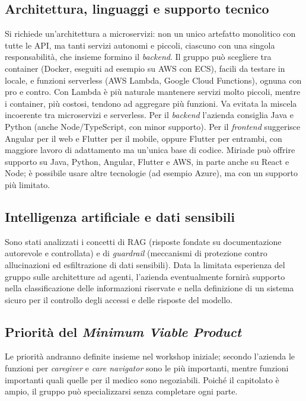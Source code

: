 \documentclass[11pt, a4paper]{article}
\begin{document}
\subsection{Architettura, linguaggi e supporto tecnico}
Si richiede un'architettura a microservizi: non un unico artefatto monolitico con tutte le API, ma tanti servizi autonomi e piccoli, ciascuno con una singola responsabilità, che insieme formino il \emph{backend}. Il gruppo può scegliere tra container (Docker, eseguiti ad esempio su AWS con ECS), facili da testare in locale, e funzioni serverless (AWS Lambda, Google Cloud Functions), ognuna con pro e contro. Con Lambda è più naturale mantenere servizi molto piccoli, mentre i container, più costosi, tendono ad aggregare più funzioni. Va evitata la miscela incoerente tra microservizi e serverless. Per il \emph{backend} l'azienda consiglia Java e Python (anche Node/TypeScript, con minor supporto). Per il \emph{frontend} suggerisce Angular per il web e Flutter per il mobile, oppure Flutter per entrambi, con maggiore lavoro di adattamento ma un'unica base di codice. Miriade può offrire supporto su Java, Python, Angular, Flutter e AWS, in parte anche su React e Node; è possibile usare altre tecnologie (ad esempio Azure), ma con un supporto più limitato.

\subsection{Intelligenza artificiale e dati sensibili}
Sono stati analizzati i concetti di RAG (risposte fondate su documentazione autorevole e controllata) e di \emph{guardrail} (meccanismi di protezione contro allucinazioni ed esfiltrazione di dati sensibili). Data la limitata esperienza del gruppo sulle architetture ad agenti, l'azienda eventualmente fornirà supporto nella classificazione delle informazioni riservate e nella definizione di un sistema sicuro per il controllo degli accessi e delle risposte del modello.

\subsection{Priorità del \emph{Minimum Viable Product}}
Le priorità andranno definite insieme nel workshop iniziale; secondo l'azienda le funzioni per \emph{caregiver} e \emph{care navigator} sono le più importanti, mentre funzioni  importanti quali quelle per il medico sono negoziabili. Poiché il capitolato è ampio, il gruppo può specializzarsi senza completare ogni parte.
\end{document}
